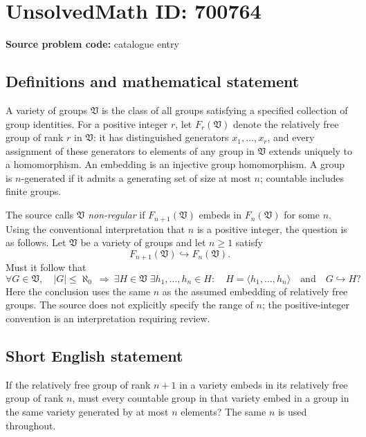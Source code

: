 \documentclass[11pt]{article}
\begin{document}
\section*{UnsolvedMath ID: 700764}
\textbf{Source problem code:} catalogue entry
\subsection{Definitions and mathematical statement}
A variety of groups \(\mathfrak V\) is the class of all groups satisfying a specified collection of group identities. For a positive integer \(r\), let \(F_r(\mathfrak V)\) denote the relatively free group of rank \(r\) in \(\mathfrak V\): it has distinguished generators \(x_1,\ldots,x_r\), and every assignment of these generators to elements of any group in \(\mathfrak V\) extends uniquely to a homomorphism. An embedding is an injective group homomorphism. A group is \(n\)-generated if it admits a generating set of size at most \(n\); countable includes finite groups.

The source calls \(\mathfrak V\) \emph{non-regular} if \(F_{n+1}(\mathfrak V)\) embeds in \(F_n(\mathfrak V)\) for some \(n\). Using the conventional interpretation that \(n\) is a positive integer, the question is as follows. Let \(\mathfrak V\) be a variety of groups and let \(n\geq 1\) satisfy
\[
F_{n+1}(\mathfrak V)\hookrightarrow F_n(\mathfrak V).
\]
Must it follow that
\[
\forall G\in\mathfrak V,\quad |G|\leq\aleph_0
\ \Longrightarrow\ 
\exists H\in\mathfrak V\;\exists h_1,\ldots,h_n\in H:
\quad H=\langle h_1,\ldots,h_n\rangle
\quad\text{and}\quad G\hookrightarrow H?
\]
Here the conclusion uses the same \(n\) as the assumed embedding of relatively free groups. The source does not explicitly specify the range of \(n\); the positive-integer convention is an interpretation requiring review.
\subsection{Short English statement}
If the relatively free group of rank \(n+1\) in a variety embeds in its relatively free group of rank \(n\), must every countable group in that variety embed in a group in the same variety generated by at most \(n\) elements? The same \(n\) is used throughout.
\end{document}
